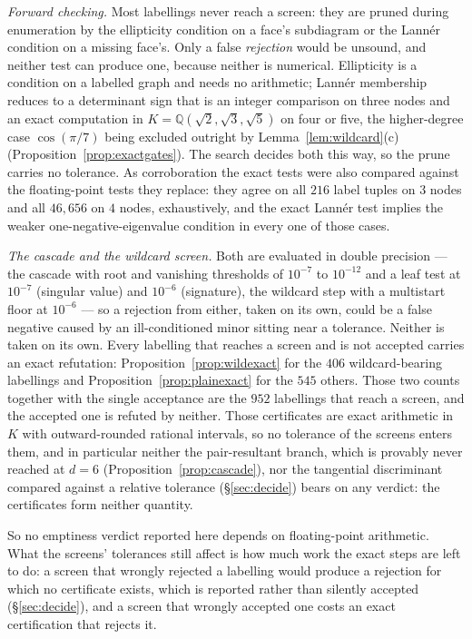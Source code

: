 \documentclass[11pt,reqno]{amsart}
\theoremstyle{plain}
\theoremstyle{definition}
\newcommand{\QQ}{\mathbb{Q}}
\newcommand{\PlainRejected}{545}
\newcommand{\NumWild}{406}
\newcommand{\NumAssignments}{952}
\begin{document}
\begin{enumerate}
  \emph{Forward checking.} Most labellings never reach a screen: they are pruned
  during enumeration by the ellipticity condition on a face's subdiagram or the
  Lann\'er condition on a missing face's. Only a false \emph{rejection} would be
  unsound, and neither test can produce one, because neither is numerical.
  Ellipticity is a condition on a labelled graph and needs no arithmetic; Lann\'er
  membership reduces to a determinant sign that is an integer comparison on three
  nodes and an exact computation in $K=\QQ(\sqrt2,\sqrt3,\sqrt5)$ on four or five,
  the higher-degree case $\cos(\pi/7)$ being excluded outright by
  Lemma~\ref{lem:wildcard}(c) (Proposition~\ref{prop:exactgates}). The search
  decides both this way, so the prune carries no tolerance. As corroboration the
  exact tests were also compared against the floating-point tests they replace:
  they agree on all $216$ label tuples on $3$ nodes and all $46{,}656$ on $4$
  nodes, exhaustively, and the exact Lann\'er test implies the weaker
  one-negative-eigenvalue condition in every one of those cases.

  \emph{The cascade and the wildcard screen.} Both are evaluated in double
  precision --- the cascade with root and vanishing thresholds of $10^{-7}$ to
  $10^{-12}$ and a leaf test at $10^{-7}$ (singular value) and $10^{-6}$
  (signature), the wildcard step with a multistart floor at $10^{-6}$ --- so a
  rejection from either, taken on its own, could be a false negative caused by an
  ill-conditioned minor sitting near a tolerance. Neither is taken on its own.
  Every labelling that reaches a screen and is not accepted carries an exact
  refutation: Proposition~\ref{prop:wildexact} for the $\NumWild$ wildcard-bearing
  labellings and Proposition~\ref{prop:plainexact} for the $\PlainRejected$ others.
  Those two counts together with the single acceptance are the $\NumAssignments$
  labellings that reach a screen, and the accepted one is refuted by neither. Those
  certificates are exact arithmetic in $K$ with outward-rounded rational intervals,
  so no tolerance of the screens enters them, and in particular neither the
  pair-resultant branch, which is provably never reached at $d=6$
  (Proposition~\ref{prop:cascade}), nor the tangential discriminant compared
  against a relative tolerance (\S\ref{sec:decide}) bears on any verdict: the
  certificates form neither quantity.

  So no emptiness verdict reported here depends on floating-point arithmetic. What
  the screens' tolerances still affect is how much work the exact steps are left to
  do: a screen that wrongly rejected a labelling would produce a rejection for
  which no certificate exists, which is reported rather than silently accepted
  (\S\ref{sec:decide}), and a screen that wrongly accepted one costs an exact
  certification that rejects it.


\end{enumerate}
\end{document}
